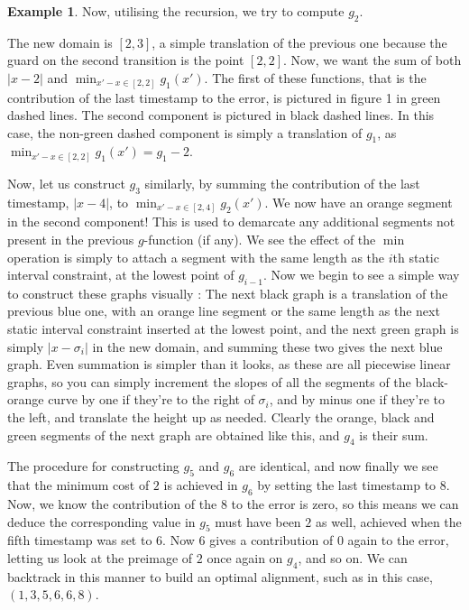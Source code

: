 \documentclass{article}
\theoremstyle{Definition}
\theoremstyle{definition}
\newtheorem{example}{Example}
\begin{document}
\begin{example}
	Now, utilising the recursion, we try to compute $g_2$.  
	
	The new domain is $[2,3]$, a simple translation of the previous one because the guard on the second transition is the point $[2,2]$. 
	Now, we want the sum of both $|x-2|$ and $\min_{x' - x \in [2,2]}g_1(x')$. 
	The first of these functions, that is the contribution of the last timestamp to the error, is pictured in figure 1 in green dashed lines. 
	The second component is pictured in black dashed lines. 
	In this case, the non-green dashed component is simply a translation of $g_1$, as $\min_{x' - x \in [2,2]}g_1(x') = g_1 - 2$. 
	
	Now, let us construct $g_3$ similarly, by summing the contribution of the last timestamp, $|x - 4|$, to  $\min_{x' - x \in [2,4]}g_2(x')$. 
	We now have an orange segment in the second component! This is used to demarcate any additional segments not present in the previous $g$-function (if any). 
	We see the effect of the $\min$ operation is simply to attach a segment with the same length as the $i$th static interval constraint, at the lowest point of $g_{i-1}$. 
	Now we begin to see a simple way to construct these graphs visually : The next black graph is a translation of the previous blue one, with an orange line segment or the same length as the next static interval constraint inserted at the lowest point, and the next green graph is simply $|x-\sigma_i|$ in the new domain, and summing these two gives the next blue graph. 
	Even summation is simpler than it looks, as these are all piecewise linear graphs, so you can simply increment the slopes of all the segments of the black-orange curve by one if they're to the right of $\sigma_i$, and by minus one if they're to the left, and translate the height up as needed. 
	Clearly the orange, black and green segments of the next graph are obtained like this, and $g_4$ is their sum. 
	
	The procedure for constructing $g_5$ and $g_6$ are identical, and now finally we see that the minimum cost of $2$ is achieved in $g_6$ by setting the last timestamp to $8$. 
	Now, we know the contribution of the $8$ to the error is zero, so this means we can deduce the corresponding value in $g_5$ must have been $2$ as well, achieved when the fifth timestamp was set to $6$. 
	Now $6$ gives a contribution of $0$ again to the error, letting us look at the preimage of $2$ once again on $g_4$, and so on. 
	We can backtrack in this manner to build an optimal alignment, such as in this case, $(1,3,5,6,6,8)$. 
\end{example}
\end{document}
